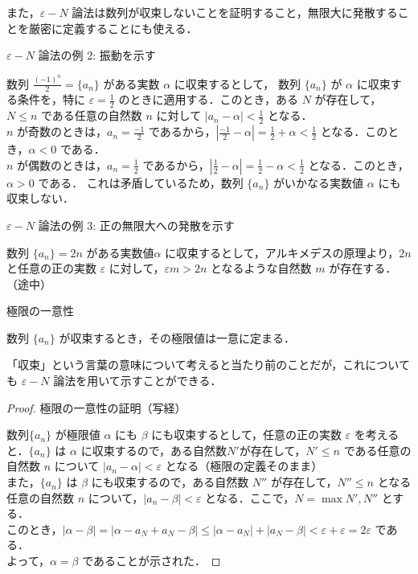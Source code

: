 \documentclass[a4paper]{ltjsarticle}
\begin{document}
また，$\varepsilon - N$ 論法は数列が収束しないことを証明すること，無限大に発散することを厳密に定義することにも使える．
\begin{mytcb}{$ \varepsilon - N$ 論法の例 2: 振動を示す}{}

数列 $\frac{(-1)^n}{2} = \{a_n\}$ がある実数 $\alpha$ に収束するとして，
数列 $\{a_n\}$ が $\alpha$ に収束する条件を，特に $\varepsilon = \frac{1}{2}$ のときに適用する．このとき，ある $N$ が存在して，$N \leq n$ である任意の自然数 $n$ に対して $|a_n - \alpha| < \frac{1}{2}$ となる．
\\
$n$ が奇数のときは，$a_n = \frac{-1}{2}$ であるから，$|\frac{-1}{2} - \alpha| = \frac{1}{2} + \alpha < \frac{1}{2}$ となる．このとき，$\alpha < 0$ である．
\\
$n$ が偶数のときは，$a_n = \frac{1}{2}$ であるから，$|\frac{1}{2} - \alpha| = \frac{1}{2} - \alpha < \frac{1}{2}$ となる．このとき，$\alpha > 0$ である．
これは矛盾しているため，数列 $\{a_n\}$ がいかなる実数値 $\alpha$ にも収束しない．

\end{mytcb}

\begin{mytcb}{$ \varepsilon - N$ 論法の例 3: 正の無限大への発散を示す}{}

数列 $\{a_n\} = 2n$ がある実数値$ \alpha$ に収束するとして，アルキメデスの原理より，$2n$ と任意の正の実数 $\varepsilon$ に対して，$\varepsilon m > 2n$ となるような自然数 $m$ が存在する． （途中）

\end{mytcb}

\begin{theorem}{極限の一意性}{}

数列 $\{a_n\}$ が収束するとき，その極限値は一意に定まる．

\end{theorem}

「収束」という言葉の意味について考えると当たり前のことだが，これについても $\varepsilon - N$ 論法を用いて示すことができる．

\pagebreak

\begin{proof}{極限の一意性の証明（写経）}{}

数列$\{a_n\}$ が極限値 $\alpha$ にも $\beta$ にも収束するとして，任意の正の実数 $\varepsilon$ を考えると．$\{a_n\}$ は $\alpha$ に収束するので，ある自然数$N'$が存在して，$N' \leq n$ である任意の自然数 $n$ について $|a_n - \alpha| < \varepsilon$ となる（極限の定義そのまま）
\\
また，$\{a_n\}$ は $\beta$ にも収束するので，ある自然数 $N''$ が存在して，$N'' \leq  n$ となる任意の自然数 $n$ について，$|a_n - \beta| < \varepsilon$ となる．ここで，$N = \max { N', N''}$ とする．
\\
このとき，$|\alpha - \beta| = |\alpha - a_N + a_N - \beta| \leq |\alpha - a_N| + |a_N - \beta| < \varepsilon + \varepsilon = 2\varepsilon$ である．
\\
よって，$\alpha = \beta$ であることが示された．

\end{proof}
\end{document}
